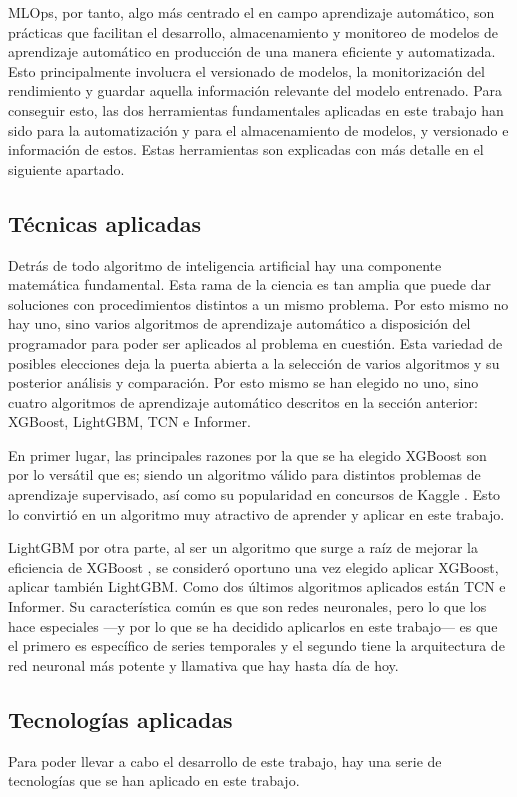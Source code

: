 MLOps, por tanto, algo más centrado el en campo aprendizaje automático, son prácticas que  facilitan el desarrollo, almacenamiento y monitoreo de modelos de aprendizaje automático en producción de  una manera eficiente y automatizada. Esto principalmente involucra el versionado de modelos, la monitorización del rendimiento y guardar aquella información relevante del modelo entrenado. Para conseguir esto, las dos herramientas fundamentales aplicadas en este trabajo han sido  para la automatización y  para el almacenamiento de modelos, y versionado e información de estos. Estas herramientas son explicadas con más detalle en el siguiente apartado.
\subsection{Técnicas aplicadas}
Detrás de todo algoritmo de inteligencia artificial hay una componente matemática fundamental. Esta rama de la ciencia es tan amplia que puede dar soluciones con procedimientos distintos a un mismo problema. Por esto mismo no hay uno, sino varios algoritmos de aprendizaje automático a disposición del programador para poder ser aplicados al problema en cuestión. Esta variedad de posibles elecciones deja la puerta abierta a la selección de varios algoritmos y su posterior análisis y comparación. Por esto mismo se han elegido no uno, sino cuatro algoritmos de aprendizaje automático descritos en la sección anterior: XGBoost, LightGBM, TCN e Informer. 

En primer lugar, las principales razones por la que se ha elegido XGBoost son por lo versátil que es; siendo un algoritmo válido para distintos problemas de aprendizaje supervisado, así como su popularidad en concursos de Kaggle \parencite{XGBoost}. Esto lo convirtió en un algoritmo muy atractivo de aprender y aplicar en este trabajo.

LightGBM por otra parte, al ser un algoritmo que surge a raíz de mejorar la eficiencia de XGBoost \parencite{lightGBM}, se consideró oportuno una vez elegido aplicar XGBoost, aplicar también LightGBM. Como dos últimos algoritmos aplicados están TCN e Informer. Su característica común es que son redes neuronales, pero lo que los hace especiales ---y por lo que se ha decidido aplicarlos en este trabajo--- es que el primero es específico de series temporales y el segundo tiene la arquitectura de red neuronal más potente y llamativa que hay hasta día de hoy.


\subsection{Tecnologías aplicadas}
Para poder llevar a cabo el desarrollo de este trabajo, hay una serie de tecnologías que se han aplicado en este trabajo.

